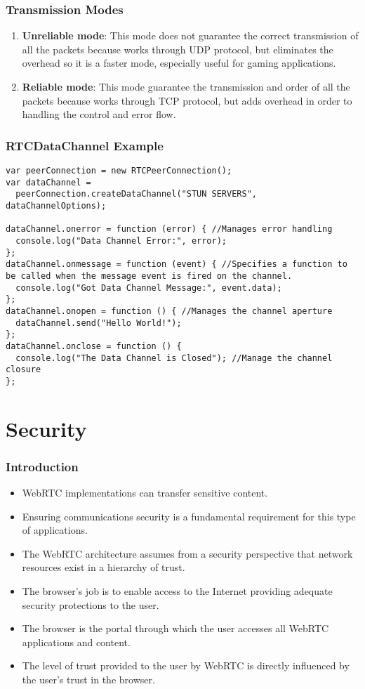 \begin{frame}[fragile]\frametitle{Transmission Modes}
\begin{enumerate}
\item \textbf{Unreliable mode}: This mode does not guarantee the correct transmission of all the packets because works through UDP protocol, but 
eliminates the overhead so it is a faster mode, especially useful for gaming applications.

\item \textbf{Reliable mode}: This mode guarantee the transmission and order of all the packets because works through TCP protocol, but 
adds overhead in order to handling the control and error flow.
\end{enumerate}
\end{frame}


\begin{frame}[fragile]\frametitle{RTCDataChannel Example}
\begin{lstlisting}[style=JavaScript]
var peerConnection = new RTCPeerConnection();
var dataChannel =
  peerConnection.createDataChannel("STUN SERVERS", dataChannelOptions);

dataChannel.onerror = function (error) { //Manages error handling
  console.log("Data Channel Error:", error);
};
dataChannel.onmessage = function (event) { //Specifies a function to be called when the message event is fired on the channel.
  console.log("Got Data Channel Message:", event.data);
};
dataChannel.onopen = function () { //Manages the channel aperture
  dataChannel.send("Hello World!");
};
dataChannel.onclose = function () {
  console.log("The Data Channel is Closed"); //Manage the channel closure
};
\end{lstlisting}
\end{frame}


\section{Security}

\begin{frame}[fragile]\frametitle{Introduction}
\begin{itemize}
\small
\item WebRTC implementations can transfer sensitive content.
\item Ensuring communications security is a fundamental requirement for this type of applications.
\item The WebRTC architecture assumes from a security perspective that network resources exist in a 
hierarchy of trust.
\item The browser's job is to enable access to the Internet providing adequate security protections to the user. 
\item The browser is the portal through which the user accesses all WebRTC applications and content.
\item The level of trust provided to the user by WebRTC is directly influenced by the user's trust in the browser.
\end{itemize}
\end{frame}

